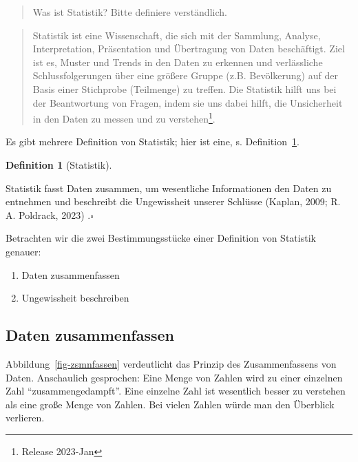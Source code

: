 \documentclass[
  letterpaper,
]{scrbook}
\providecommand{\tightlist}{%
  \setlength{\itemsep}{0pt}\setlength{\parskip}{0pt}}\usepackage{longtable,booktabs,array}
\theoremstyle{definition}
\theoremstyle{definition}
\newtheorem{definition}{Definition}[chapter]
\theoremstyle{definition}
\theoremstyle{remark}
\begin{document}
\begin{quote}
{} Was ist Statistik? Bitte definiere verständlich.
\end{quote}

\begin{quote}
{} Statistik ist eine Wissenschaft, die sich mit der
Sammlung, Analyse, Interpretation, Präsentation und Übertragung von
Daten beschäftigt. Ziel ist es, Muster und Trends in den Daten zu
erkennen und verlässliche Schlussfolgerungen über eine größere Gruppe
(z.B. Bevölkerung) auf der Basis einer Stichprobe (Teilmenge) zu
treffen. Die Statistik hilft uns bei der Beantwortung von Fragen, indem
sie uns dabei hilft, die Unsicherheit in den Daten zu messen und zu
verstehen\footnote{Release 2023-Jan}.
\end{quote}

Es gibt mehrere Definition von Statistik; hier ist eine, s.
Definition~\ref{def-statistik}.

\begin{definition}[Statistik]\protect\hypertarget{def-statistik}{}\label{def-statistik}

Statistik fasst Daten zusammen, um wesentliche Informationen den Daten
zu entnehmen und beschreibt die Ungewissheit unserer Schlüsse (Kaplan,
2009; R. A. Poldrack, 2023) .\(\square\)

\end{definition}

Betrachten wir die zwei Bestimmungsstücke einer Definition von Statistik
genauer:

\begin{enumerate}
\def\labelenumi{\arabic{enumi}.}
\tightlist
\item
  Daten zusammenfassen
\item
  Ungewissheit beschreiben
\end{enumerate}

\subsection{Daten zusammenfassen}\label{daten-zusammenfassen}

Abbildung~\ref{fig-zsmnfassen} verdeutlicht das Prinzip des
Zusammenfassens von Daten. Anschaulich gesprochen: Eine Menge von Zahlen
wird zu einer einzelnen Zahl ``zusammengedampft''. Eine einzelne Zahl
ist wesentlich besser zu verstehen als eine große Menge von Zahlen. Bei
vielen Zahlen würde man den Überblick verlieren.
\end{document}
